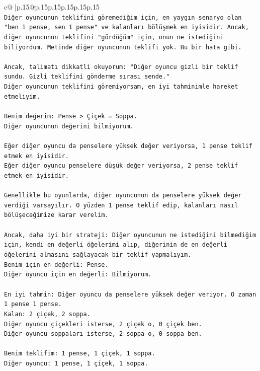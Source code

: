 \documentclass{article}
\begin{document}
{\begin{supertabular}{c@{$\;$}|p{.15\linewidth}@{}p{.15\linewidth}p{.15\linewidth}p{.15\linewidth}p{.15\linewidth}p{.15\linewidth}}
{{{\\ 
\texttt{Diğer oyuncunun teklifini göremediğim için, en yaygın senaryo olan "ben 1 pense, sen 1 pense" ve kalanları bölüşmek en iyisidir. Ancak, diğer oyuncunun teklifini "gördüğüm" için, onun ne istediğini biliyordum. Metinde diğer oyuncunun teklifi yok. Bu bir hata gibi.} \\
\\ 
\texttt{Ancak, talimatı dikkatli okuyorum: "Diğer oyuncu gizli bir teklif sundu. Gizli teklifini gönderme sırası sende."} \\
\texttt{Diğer oyuncunun teklifini göremiyorsam, en iyi tahminimle hareket etmeliyim.} \\
\\ 
\texttt{Benim değerim: Pense > Çiçek = Soppa.} \\
\texttt{Diğer oyuncunun değerini bilmiyorum.} \\
\\ 
\texttt{Eğer diğer oyuncu da penselere yüksek değer veriyorsa, 1 pense teklif etmek en iyisidir.} \\
\texttt{Eğer diğer oyuncu penselere düşük değer veriyorsa, 2 pense teklif etmek en iyisidir.} \\
\\ 
\texttt{Genellikle bu oyunlarda, diğer oyuncunun da penselere yüksek değer verdiği varsayılır. O yüzden 1 pense teklif edip, kalanları nasıl bölüşeceğimize karar verelim.} \\
\\ 
\texttt{Ancak, daha iyi bir strateji: Diğer oyuncunun ne istediğini bilmediğim için, kendi en değerli öğelerimi alıp, diğerinin de en değerli öğelerini almasını sağlayacak bir teklif yapmalıyım.} \\
\texttt{Benim için en değerli: Pense.} \\
\texttt{Diğer oyuncu için en değerli: Bilmiyorum.} \\
\\ 
\texttt{En iyi tahmin: Diğer oyuncu da penselere yüksek değer veriyor. O zaman 1 pense 1 pense.} \\
\texttt{Kalan: 2 çiçek, 2 soppa.} \\
\texttt{Diğer oyuncu çiçekleri isterse, 2 çiçek o, 0 çiçek ben.} \\
\texttt{Diğer oyuncu soppaları isterse, 2 soppa o, 0 soppa ben.} \\
\\ 
\texttt{Benim teklifim: 1 pense, 1 çiçek, 1 soppa.} \\
\texttt{Diğer oyuncu: 1 pense, 1 çiçek, 1 soppa.} \\
}}}
\end{supertabular}}
\end{document}
